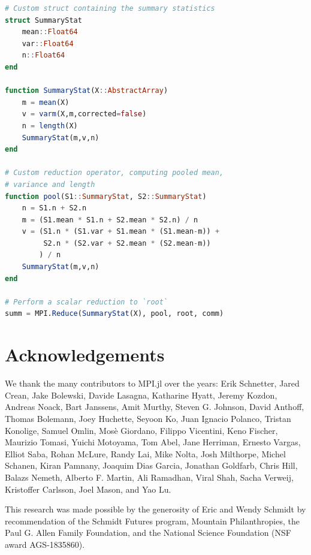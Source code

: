 \documentclass{juliacon}
\begin{document}
\begin{lstlisting}[language = Julia]
# Custom struct containing the summary statistics
struct SummaryStat
    mean::Float64
    var::Float64
    n::Float64
end

function SummaryStat(X::AbstractArray)
    m = mean(X)
    v = varm(X,m,corrected=false)
    n = length(X)
    SummaryStat(m,v,n)
end

# Custom reduction operator, computing pooled mean,
# variance and length
function pool(S1::SummaryStat, S2::SummaryStat)
    n = S1.n + S2.n
    m = (S1.mean * S1.n + S2.mean * S2.n) / n
    v = (S1.n * (S1.var + S1.mean * (S1.mean-m)) +
         S2.n * (S2.var + S2.mean * (S2.mean-m))
        ) / n
    SummaryStat(m,v,n)
end

# Perform a scalar reduction to `root`
summ = MPI.Reduce(SummaryStat(X), pool, root, comm)
\end{lstlisting}

\section{Acknowledgements}
\label{sec:acknowledgements}

We thank the many contributors to MPI.jl over the years: Erik Schnetter,
Jared Crean, Jake Bolewski, Davide Lasagna, Katharine Hyatt, Jeremy
Kozdon, Andreas Noack, Bart Janssens, Amit Murthy, Steven G. Johnson,
David Anthoff, Thomas Bolemann, Joey Huchette, Seyoon Ko, Juan Ignacio
Polanco, Tristan Konolige, Samuel Omlin, Mosè Giordano, Filippo
Vicentini, Keno Fischer, Maurizio Tomasi, Yuichi Motoyama, Tom Abel,
Jane Herriman, Ernesto Vargas, Elliot Saba, Rohan McLure, Randy Lai,
Mike Nolta, Josh Milthorpe, Michel Schanen, Kiran Pamnany, Joaquim Dias
Garcia, Jonathan Goldfarb, Chris Hill, Balazs Nemeth, Alberto F. Martin,
Ali Ramadhan, Viral Shah, Sacha Verweij, Kristoffer Carlsson, Joel Mason,
and Yao Lu.

This research was made possible by the generosity of Eric and Wendy
Schmidt by recommendation of the Schmidt Futures program, Mountain
Philanthropies, the Paul G. Allen Family Foundation, and the National
Science Foundation (NSF award AGS-1835860).



\end{document}
